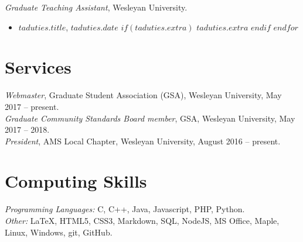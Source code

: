\documentclass[10pt]{res}
\newcommand{\bigsection}[1]{\section{\large{#1}}}
\begin{document}
\begin{resume}
{\sl Graduate Teaching Assistant}, Wesleyan University. \\
\begin{itemize}
  $for(taduties)$
    \item $taduties.title$, $taduties.date$
    $if(taduties.extra)$
      \subitem $taduties.extra$
    $endif$
  $endfor$
\end{itemize}

\bigsection{Services}

{\sl Webmaster}, Graduate Student Association (GSA), Wesleyan University, May 2017 -- present. \\
{\sl Graduate Community Standards Board member}, GSA, Wesleyan University, May 2017 -- 2018. \\
{\sl President}, AMS Local Chapter, Wesleyan University, August 2016 -- present. \\

\bigsection{Computing Skills}

{\sl Programming Languages: }
C, C++, Java, Javascript, PHP, Python. \\
{\sl Other: }
LaTeX, HTML5, CSS3, Markdown,
SQL, NodeJS,
MS Office, Maple,
Linux, Windows,
git, GitHub.

\end{resume}
\end{document}

